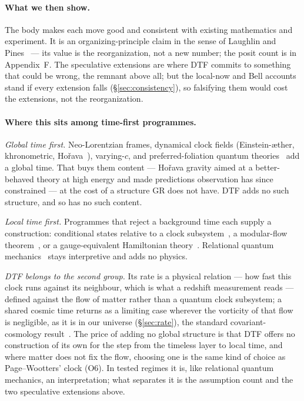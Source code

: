 \documentclass[11pt]{article}
\begin{document}
\paragraph{What we then show.} The body makes each move good and consistent with existing mathematics and
experiment. It is an organizing-principle claim in the sense of Laughlin and Pines~\cite{LaughlinPines2000}
--- its value is the reorganization, not a new number; the posit count is in Appendix~F. The speculative
extensions are where DTF commits to something that could be wrong, the remnant above all; but the local-now and
Bell accounts stand if every extension falls (\S\ref{sec:consistency}), so falsifying them would cost the extensions, not the
reorganization.

\paragraph{Where this sits among time-first programmes.}
\emph{Global time first.} Neo-Lorentzian frames, dynamical clock fields (Einstein-\ae ther, khronometric,
Ho\v{r}ava~\cite{Jacobson2001,BlasPujolasSibiryakov2011,Horava2009}), varying-$c$, and preferred-foliation
quantum theories~\cite{DGMZ1999} add a global time. That buys them content --- Ho\v{r}ava gravity aimed at a
better-behaved theory at high energy and made predictions observation has since constrained --- at the cost of
a structure GR does not have. DTF adds no such structure, and so has no such content.

\emph{Local time first.} Programmes that reject a background time each supply a construction: conditional
states relative to a clock subsystem~\cite{PageWootters1983}, a modular-flow theorem~\cite{ConnesRovelli1994},
or a gauge-equivalent Hamiltonian theory~\cite{Barbour2002}. Relational quantum mechanics~\cite{Rovelli1996}
stays interpretive and adds no physics.

\emph{DTF belongs to the second group.} Its rate is a physical relation --- how fast this clock runs against
its neighbour, which is what a redshift measurement reads --- defined against the flow of matter rather than a
quantum clock subsystem; a shared cosmic time returns as a limiting case wherever the vorticity of that flow is
negligible, as it is in our universe (\S\ref{sec:rate}), the standard covariant-cosmology result~\cite{Ellis1971}. The
price of adding no global structure is that DTF offers no construction of its own for the step from the
timeless layer to local time, and where matter does not fix the flow, choosing one is the same kind of choice
as Page--Wootters' clock (O6). In tested regimes it is, like relational quantum mechanics, an interpretation;
what separates it is the assumption count and the two speculative extensions above.
\end{document}
